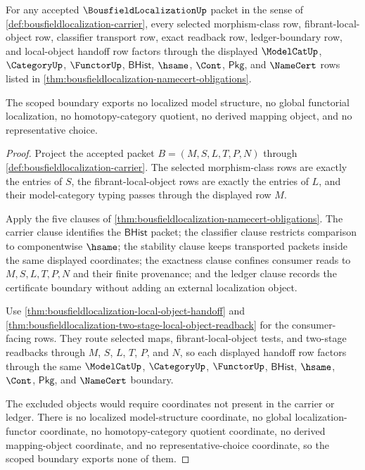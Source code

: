 \begin{theorem}
\label{thm:bousfieldlocalization-scoped-kernel-boundary}
For any accepted $\BousfieldLocalizationUp$ packet in the sense of \autoref{def:bousfieldlocalization-carrier}, every selected morphism-class row, fibrant-local-object row, classifier transport row, exact readback row, ledger-boundary row, and local-object handoff row factors through the displayed $\ModelCatUp$, $\CategoryUp$, $\FunctorUp$, $\mathsf{BHist}$, $\hsame$, $\Cont$, $\mathsf{Pkg}$, and $\NameCert$ rows listed in \autoref{thm:bousfieldlocalization-namecert-obligations}.

The scoped boundary exports no localized model structure, no global functorial localization, no homotopy-category quotient, no derived mapping object, and no representative choice.
\end{theorem}
\begin{proof}
Project the accepted packet $B=(M,S,L,T,P,N)$ through \autoref{def:bousfieldlocalization-carrier}. The selected morphism-class rows are exactly the entries of $S$, the fibrant-local-object rows are exactly the entries of $L$, and their model-category typing passes through the displayed row $M$.

Apply the five clauses of \autoref{thm:bousfieldlocalization-namecert-obligations}. The carrier clause identifies the $\mathsf{BHist}$ packet; the classifier clause restricts comparison to componentwise $\hsame$; the stability clause keeps transported packets inside the same displayed coordinates; the exactness clause confines consumer reads to $M,S,L,T,P,N$ and their finite provenance; and the ledger clause records the certificate boundary without adding an external localization object.

Use \autoref{thm:bousfieldlocalization-local-object-handoff} and \autoref{thm:bousfieldlocalization-two-stage-local-object-readback} for the consumer-facing rows. They route selected maps, fibrant-local-object tests, and two-stage readbacks through $M$, $S$, $L$, $T$, $P$, and $N$, so each displayed handoff row factors through the same $\ModelCatUp$, $\CategoryUp$, $\FunctorUp$, $\mathsf{BHist}$, $\hsame$, $\Cont$, $\mathsf{Pkg}$, and $\NameCert$ boundary.

The excluded objects would require coordinates not present in the carrier or ledger. There is no localized model-structure coordinate, no global localization-functor coordinate, no homotopy-category quotient coordinate, no derived mapping-object coordinate, and no representative-choice coordinate, so the scoped boundary exports none of them.
\end{proof}

